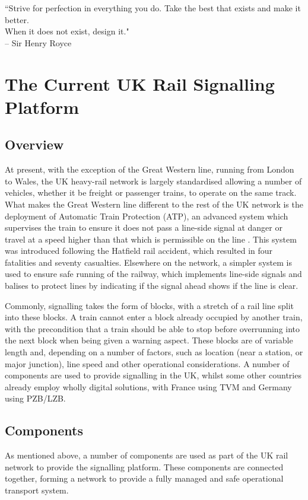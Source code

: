 \documentclass[twoside,11pt,a4paper]{article}
\begin{document}
\begin{center}
``Strive for perfection in everything you do. Take the best that exists and make it better.\\When it does not exist, design it."\\-- Sir Henry Royce

\end{center}

\clearpage

\section{The Current UK Rail Signalling Platform}
\subsection{Overview}
At present, with the exception of the Great Western line, running from London to Wales, the UK heavy-rail network is largely standardised allowing a number of vehicles, whether it be freight or passenger trains, to operate on the same track. What makes the Great Western line different to the rest of the UK network is the deployment of Automatic Train Protection (ATP), an advanced system which supervises the train to ensure it does not pass a line-side signal at danger or travel at a speed higher than that which is permissible on the line \citep{BBCATP00}. This system was introduced following the Hatfield rail accident, which resulted in four fatalities and seventy casualties. Elsewhere on the network, a simpler system is used to ensure safe running of the railway, which implements line-side signals and balises to protect lines by indicating if the signal ahead shows if the line is clear.

Commonly, signalling takes the form of blocks, with a stretch of a rail line split into these blocks. A train cannot enter a block already occupied by another train, with the precondition that a train should be able to stop before overrunning into the next block when being given a warning aspect. These blocks are of variable length and, depending on a number of factors, such as location (near a station, or major junction), line speed and other operational considerations. A number of components are used to provide signalling in the UK, whilst some other countries already employ wholly digital solutions, with France using TVM and Germany using PZB/LZB.

\subsection{Components}
As mentioned above, a number of components are used as part of the UK rail network to provide the signalling platform. These components are connected together, forming a network to provide a fully managed and safe operational transport system.
\end{document}
